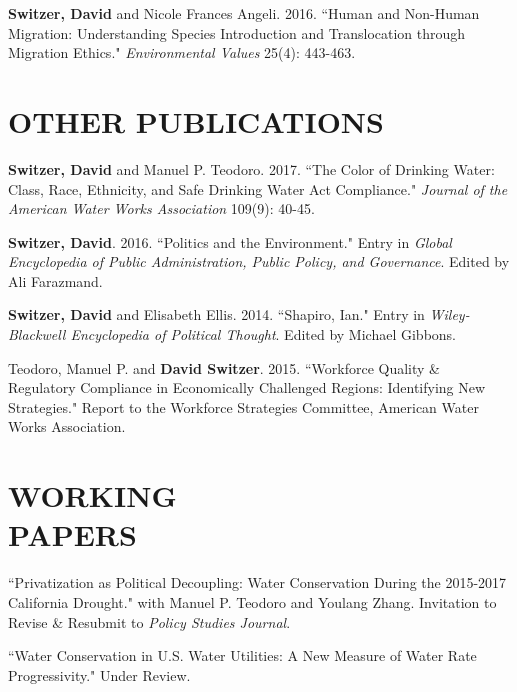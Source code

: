 \documentclass[margin]{res} %
\begin{document}
\begin{resume}
\begin{hangparas}{.25in}{1}
\textbf{Switzer, David} and Nicole Frances Angeli. 2016. ``Human and Non-Human Migration: Understanding Species Introduction and Translocation through Migration Ethics." \textit{Environmental Values} 25(4): 443-463. \end{hangparas}



 \section{OTHER PUBLICATIONS}

 \begin{hangparas}{.25in}{1} \textbf{Switzer, David} and Manuel P. Teodoro. 2017. ``The Color of Drinking Water: Class, Race, Ethnicity, and Safe Drinking Water Act Compliance." \textit{Journal of the American Water Works Association} 109(9): 40-45.
 
 \textbf{Switzer, David}. 2016. ``Politics and the Environment." Entry in \textit{Global Encyclopedia of Public Administration, Public Policy, and Governance}. Edited by Ali Farazmand.

\textbf{Switzer, David} and Elisabeth Ellis. 2014. ``Shapiro, Ian." Entry in \textit{Wiley-Blackwell Encyclopedia of Political Thought}. Edited by Michael Gibbons.

Teodoro, Manuel P. and \textbf{David Switzer}. 2015. ``Workforce Quality \& Regulatory Compliance in Economically Challenged Regions: Identifying New Strategies." Report to the Workforce Strategies Committee, American Water Works Association. \end{hangparas}

\section{WORKING\\ PAPERS\\}

 \begin{hangparas}{.25in}{1} ``Privatization as Political Decoupling: Water Conservation During the 2015-2017 California Drought." with Manuel P. Teodoro and Youlang Zhang. Invitation to Revise \& Resubmit to \textit{Policy Studies Journal}. 

``Water Conservation in U.S. Water Utilities: A New Measure of Water Rate Progressivity." Under Review.


\end{hangparas}
\end{resume}
\end{document}
